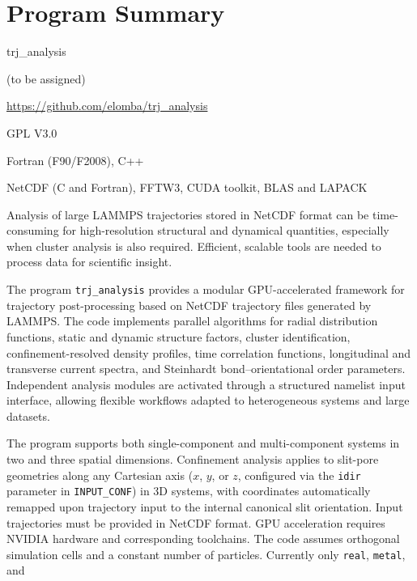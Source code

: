 \documentclass[final,1p,times]{elsarticle}
\newenvironment{programsummary}{%
\section*{Program Summary}
\begin{description}
\setlength{\itemsep}{0.2em}
}{%
\end{description}
}
\begin{document}
\begin{programsummary}

\item[Program Title:] trj\_analysis
\item[CPC Library link:] (to be assigned)
\item[Developer's repository link:] \url{https://github.com/elomba/trj_analysis}
\item[Licensing provisions:] GPL V3.0
\item[Programming language:] Fortran (F90/F2008), C++
\item[External routines/libraries:] NetCDF (C and Fortran), FFTW3, CUDA toolkit, BLAS and LAPACK
\item[Nature of problem:]
Analysis of large LAMMPS trajectories stored in NetCDF format\cite{Rew1990} can be time-consuming for high-resolution structural and dynamical quantities, especially when cluster analysis is also required. Efficient, scalable tools are needed to process data for scientific insight.
\item[Solution method:]
The program \texttt{trj\_analysis} provides a modular GPU-accelerated framework for trajectory post-processing based on NetCDF trajectory files generated by LAMMPS. The code implements parallel algorithms for radial distribution functions, static and dynamic structure factors, cluster identification, confinement-resolved density profiles, time correlation functions, longitudinal and transverse current spectra, and Steinhardt bond--orientational order parameters. Independent analysis modules are activated through a structured namelist input interface, allowing flexible workflows adapted to heterogeneous systems and large datasets.
\item[Restrictions:]
The program supports both single-component and multi-component systems
in two and three spatial dimensions. Confinement analysis applies to
slit-pore geometries along any Cartesian axis ($x$, $y$, or $z$,
configured via the \texttt{idir} parameter in \texttt{INPUT\_CONF}) in 3D systems, with coordinates
automatically remapped upon trajectory input to the internal canonical slit
orientation. Input
trajectories must be provided in NetCDF format. GPU acceleration
requires NVIDIA hardware and corresponding toolchains. The code
assumes orthogonal simulation cells and a constant number of
particles. Currently only \texttt{real}, \texttt{metal}, and

\end{programsummary}
\end{document}
